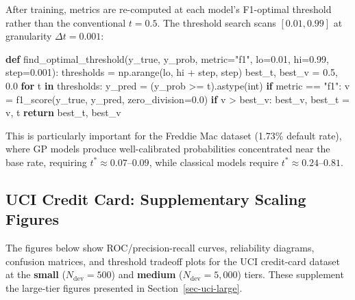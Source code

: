 \documentclass[
  letterpaper,
  DIV=11,
  numbers=noendperiod]{scrartcl}
\newenvironment{Shaded}{\begin{snugshade}}{\end{snugshade}}
\newcommand{\BuiltInTok}[1]{\textcolor[rgb]{0.00,0.23,0.31}{#1}}
\newcommand{\ControlFlowTok}[1]{\textcolor[rgb]{0.00,0.23,0.31}{\textbf{#1}}}
\newcommand{\FloatTok}[1]{\textcolor[rgb]{0.68,0.00,0.00}{#1}}
\newcommand{\KeywordTok}[1]{\textcolor[rgb]{0.00,0.23,0.31}{\textbf{#1}}}
\newcommand{\NormalTok}[1]{\textcolor[rgb]{0.00,0.23,0.31}{#1}}
\newcommand{\OperatorTok}[1]{\textcolor[rgb]{0.37,0.37,0.37}{#1}}
\newcommand{\StringTok}[1]{\textcolor[rgb]{0.13,0.47,0.30}{#1}}
\begin{document}
After training, metrics are re-computed at each model's F1-optimal
threshold rather than the conventional \(t = 0.5\). The threshold search
scans \([0.01, 0.99]\) at granularity \(\Delta t = 0.001\):

\begin{Shaded}
\begin{Highlighting}[]
\KeywordTok{def}\NormalTok{ find\_optimal\_threshold(y\_true, y\_prob, metric}\OperatorTok{=}\StringTok{"f1"}\NormalTok{, lo}\OperatorTok{=}\FloatTok{0.01}\NormalTok{, hi}\OperatorTok{=}\FloatTok{0.99}\NormalTok{,}
\NormalTok{                           step}\OperatorTok{=}\FloatTok{0.001}\NormalTok{):}
\NormalTok{    thresholds }\OperatorTok{=}\NormalTok{ np.arange(lo, hi }\OperatorTok{+}\NormalTok{ step, step)}
\NormalTok{    best\_t, best\_v }\OperatorTok{=} \FloatTok{0.5}\NormalTok{, }\FloatTok{0.0}
    \ControlFlowTok{for}\NormalTok{ t }\KeywordTok{in}\NormalTok{ thresholds:}
\NormalTok{        y\_pred }\OperatorTok{=}\NormalTok{ (y\_prob }\OperatorTok{\textgreater{}=}\NormalTok{ t).astype(}\BuiltInTok{int}\NormalTok{)}
        \ControlFlowTok{if}\NormalTok{ metric }\OperatorTok{==} \StringTok{"f1"}\NormalTok{:}
\NormalTok{            v }\OperatorTok{=}\NormalTok{ f1\_score(y\_true, y\_pred, zero\_division}\OperatorTok{=}\FloatTok{0.0}\NormalTok{)}
        \ControlFlowTok{if}\NormalTok{ v }\OperatorTok{\textgreater{}}\NormalTok{ best\_v:}
\NormalTok{            best\_v, best\_t }\OperatorTok{=}\NormalTok{ v, t}
    \ControlFlowTok{return}\NormalTok{ best\_t, best\_v}
\end{Highlighting}
\end{Shaded}

This is particularly important for the Freddie Mac dataset (1.73\%
default rate), where GP models produce well-calibrated probabilities
concentrated near the base rate, requiring
\(t^* \approx 0.07\)--\(0.09\), while classical models require
\(t^* \approx 0.24\)--\(0.81\).

\subsection{UCI Credit Card: Supplementary Scaling
Figures}\label{sec-appendix-uci-scaling}

The figures below show ROC/precision-recall curves, reliability
diagrams, confusion matrices, and threshold tradeoff plots for the UCI
credit-card dataset at the \textbf{small} (\(N_\text{dev} = 500\)) and
\textbf{medium} (\(N_\text{dev} = 5{,}000\)) tiers. These supplement the
large-tier figures presented in Section~\ref{sec-uci-large}.
\end{document}
